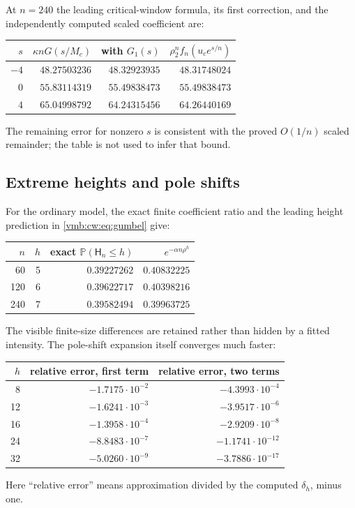 \documentclass[11pt,a4paper]{article}
\numberwithin{equation}{section}
\theoremstyle{definition}\newtheorem{definition}[theorem]{Definition}
\theoremstyle{remark}\newtheorem{remark}[theorem]{Remark}
\newcommand{\Prob}{\mathbb P}
\begin{document}
At $n=240$ the leading critical-window formula, its first correction, and
the independently computed scaled coefficient are:
\begin{center}
\begin{tabular}{@{}rrrr@{}}
\toprule
$s$ & $\kappa nG(s/M_c)$ & with $G_1(s)$ & $\rho_2^nf_n(u_c e^{s/n})$\\
\midrule
$-4$ & $48.27503236$ & $48.32923935$ & $48.31748024$\\
$0$  & $55.83114319$ & $55.49838473$ & $55.49838473$\\
$4$  & $65.04998792$ & $64.24315456$ & $64.26440169$\\
\bottomrule
\end{tabular}
\end{center}
The remaining error for nonzero $s$ is consistent with the proved $O(1/n)$
scaled remainder; the table is not used to infer that bound.

\subsection{Extreme heights and pole shifts}
For the ordinary model, the exact finite coefficient ratio and the leading
height prediction in \eqref{vmb:cw:eq:gumbel} give:
\begin{center}
\begin{tabular}{@{}rrrr@{}}
\toprule
$n$ & $h$ & exact $\Prob(\mathsf H_n\le h)$ & $e^{-\alpha n\rho^h}$\\
\midrule
60  &5& $0.39227262$ &$0.40832225$\\
120 &6& $0.39622717$ &$0.40398216$\\
240 &7& $0.39582494$ &$0.39963725$\\
\bottomrule
\end{tabular}
\end{center}
The visible finite-size differences are retained rather than hidden by a
fitted intensity. The pole-shift expansion itself converges much faster:
\begin{center}
\begin{tabular}{@{}rrr@{}}
\toprule
$h$ & relative error, first term & relative error, two terms\\
\midrule
8  & $-1.7175\cdot10^{-2}$ & $-4.3993\cdot10^{-4}$\\
12 & $-1.6241\cdot10^{-3}$ & $-3.9517\cdot10^{-6}$\\
16 & $-1.3958\cdot10^{-4}$ & $-2.9209\cdot10^{-8}$\\
24 & $-8.8483\cdot10^{-7}$ & $-1.1741\cdot10^{-12}$\\
32 & $-5.0260\cdot10^{-9}$ & $-3.7886\cdot10^{-17}$\\
\bottomrule
\end{tabular}
\end{center}
Here ``relative error'' means approximation divided by the computed
$\delta_h$, minus one.
\end{document}
